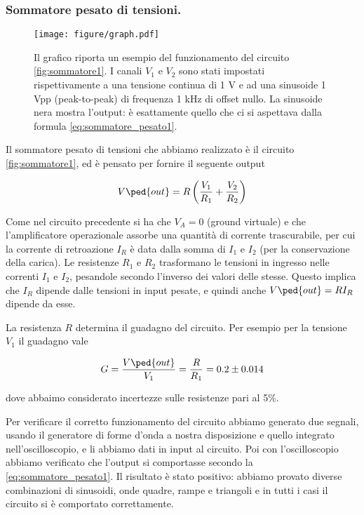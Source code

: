 \subsubsection{Sommatore pesato di tensioni.}

\begin{SCfigure*}[1][t!]
    \texttt{[image: figure/graph.pdf]}
    \caption{Il grafico riporta un esempio del funzionamento del circuito \ref{fig:sommatore1}.
        I canali $V_1$ e $V_2$ sono stati impostati rispettivamente a una tensione continua di 1 V e
        ad una sinusoide 1 Vpp (peak-to-peak) di frequenza 1 kHz di offset nullo. La sinusoide nera
        mostra l'output: è esattamente quello che ci si aspettava dalla formula \eqref{eq:sommatore_pesato1}.}
    \label{fig:graph1}
\end{SCfigure*}

Il sommatore pesato di tensioni che abbiamo realizzato è il circuito \ref{fig:sommatore1},
ed è pensato per fornire il seguente output

\begin{equation}
    V\ped{out} = R\left(\frac{V_1}{R_1} + \frac{V_2}{R_2}\right)
    \label{eq:sommatore_pesato1}
\end{equation}

Come nel circuito precedente si ha che $V_A = 0$ (ground virtuale) e che
l'amplificatore operazionale assorbe una quantità di corrente trascurabile,
per cui la corrente di retroazione $I_R$ è data dalla somma di $I_1$ e $I_2$
(per la conservazione della carica).
Le resistenze $R_1$ e $R_2$ trasformano le tensioni in ingresso nelle correnti
$I_1$ e $I_2$, pesandole secondo l'inverso dei valori delle stesse.
Questo implica che $I_R$ dipende dalle tensioni in input pesate,
e quindi anche $V\ped{out} = RI_R$ dipende da esse.

La resistenza $R$ determina il guadagno del circuito. Per esempio per la tensione
$V_1$ il guadagno vale

\begin{equation}
    G = \frac{V\ped{out}}{V_1} = \frac{R}{R_1} = 0.2 \pm 0.014
\end{equation}

dove abbaimo considerato incertezze sulle resistenze pari al 5\%.

Per verificare il corretto funzionamento del circuito abbiamo generato due segnali,
usando il generatore di forme d'onda a nostra disposizione e quello integrato
nell'oscilloscopio, e li abbiamo dati in input al circuito. Poi con l'oscilloscopio
abbiamo verificato che l'output si comportasse secondo la \eqref{eq:sommatore_pesato1}.
Il risultato è stato positivo: abbiamo provato diverse combinazioni di sinusoidi,
onde quadre, rampe e triangoli e in tutti i casi il circuito si è comportato correttamente.

